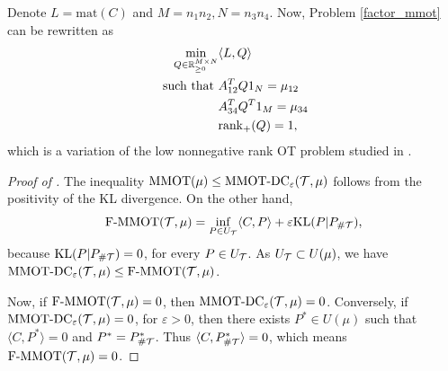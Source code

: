 Denote $L= \text{mat}(C)$ and $M = n_1 n_2, N = n_3 n_4$. Now, Problem \eqref{factor_mmot} can be rewritten as
\begin{align}
  \min_{Q \in \mathbb R^{M \times N}_{\geq 0}} &\langle L, Q \rangle \\
  \text{ such that } & A_{12}^T Q 1_N = \mu_{12} \\
  &A_{34}^T Q^T 1_M = \mu_{34} \\
  &\text{rank}_{+}(Q) = 1,
\end{align}
which is a variation of the low nonnegative rank OT problem studied in \citep{Meyer21a}.

\begin{proof}[Proof of ]
  The inequality
  $\text{MMOT}(\mu) \leq \text{MMOT-DC}_{\varepsilon}(\mathcal T, \mu)$ follows from
  the positivity of the KL divergence. On the other hand,
  \begin{equation}
    \text{F-MMOT}(\mathcal T, \mu) =
    \inf_{P \in U_{\mathcal T}} \langle C, P \rangle + \varepsilon \text{KL}(P \vert P_{\# \mathcal T}),
  \end{equation}
  because $\text{KL}(P \vert P_{\# \mathcal T}) = 0$, for every $P \in U_{\mathcal T}$. As
  $U_{\mathcal T} \subset U(\mu)$, we have
  $\text{MMOT-DC}_{\varepsilon}(\mathcal T, \mu) \leq \text{F-MMOT}(\mathcal T, \mu)$.

  Now, if $\text{F-MMOT}(\mathcal T, \mu) = 0$, then $\text{MMOT-DC}_{\varepsilon}(\mathcal T, \mu) = 0$. Conversely,
  if $\text{MMOT-DC}_{\varepsilon}(\mathcal T, \mu) = 0$, for $\varepsilon > 0$,
  then there exists $P^* \in U(\mu)$ such that $\langle C, P^* \rangle = 0$ and $P^* = P^*_{\# \mathcal T}$.
  Thus $\langle C, P^*_{\# \mathcal T} \rangle = 0$, which means $\text{F-MMOT}(\mathcal T, \mu) = 0$.
\end{proof}

